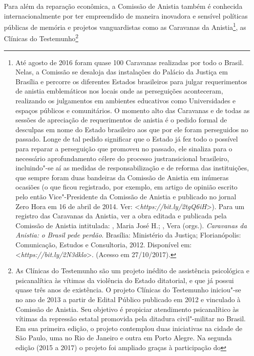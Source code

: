 Para além da reparação econômica, a Comissão de Anistia também é
conhecida internacionalmente por ter empreendido de maneira inovadora e
sensível políticas públicas de memória e projetos vanguardistas como as
Caravanas da Anistia\footnote{Até agosto de 2016 foram quase 100
  Caravanas realizadas por todo o Brasil. Nelas, a Comissão se desaloja
  das instalações do Palácio da Justiça em Brasília e percorre os
  diferentes Estados brasileiros para julgar requerimentos de anistia
  emblemáticos nos locais onde as perseguições aconteceram, realizando
  os julgamentos em ambientes educativos como Universidades e espaços
  públicos e comunitários. O momento alto das Caravanas e de todas as
  sessões de apreciação de requerimentos de anistia é o pedido formal de
  desculpas em nome do Estado brasileiro aos que por ele foram
  perseguidos no passado. Longe de tal pedido significar que o Estado já
  fez todo o possível para reparar a perseguição que promoveu no
  passado, ele sinaliza para o necessário aprofundamento célere do
  processo justransicional brasileiro, incluindo"-se aí as medidas de
  responsabilização e de reforma das instituições, que sempre foram duas
  bandeiras da Comissão de Anistia em inúmeras ocasiões (o que ficou
  registrado, por exemplo, em artigo de opinião escrito pelo então
  Vice"-Presidente da Comissão de Anistia e publicado no jornal Zero Hora
  em 16 de abril de 2014. Ver:
  \textless{}\emph{https://bit.ly/2tgQ6iH}\textgreater{}). Para um registro das
  Caravanas da Anistia, ver a obra editada e publicada pela Comissão de
  Anistia intitulada: , Maria José H.; , Vera (orgs.).
  \emph{Caravanas da Anistia: o Brasil pede perdão}. Brasília:
  Ministério da Justiça; Florianópolis: Comunicação, Estudos e
  Consultoria, 2012. Disponível em:
  \textless{}\emph{https://bit.ly/2N3dklo}\textgreater{}.
  (Acesso em 27/10/2017).}, as Clínicas do Testemunho\footnote{As
  Clínicas do Testemunho são um projeto inédito de assistência
  psicológica e psicanalítica às vítimas da violência do Estado
  ditatorial, e que já possui quase três anos de existência. O projeto
  Clínicas do Testemunho iniciou"-se no ano de 2013 a partir de Edital
  Público publicado em 2012 e vinculado à Comissão de Anistia. Seu
  objetivo é propiciar atendimento psicanalítico às vítimas da repressão
  estatal promovida pela ditadura civil"-militar no Brasil. Em sua
  primeira edição, o projeto contemplou duas iniciativas na cidade de São
  Paulo, uma no Rio de Janeiro e outra em Porto Alegre. Na segunda
  edição (2015 a 2017) o projeto foi ampliado graças à participação do
}
